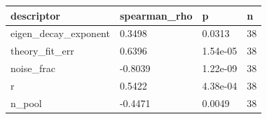 \begin{tabular}{llll}
\hline
descriptor & spearman\_rho & p & n \\
\hline
eigen\_decay\_exponent & 0.3498 & 0.0313 & 38 \\
theory\_fit\_err & 0.6396 & 1.54e-05 & 38 \\
noise\_frac & -0.8039 & 1.22e-09 & 38 \\
r & 0.5422 & 4.38e-04 & 38 \\
n\_pool & -0.4471 & 0.0049 & 38 \\
\hline
\end{tabular}
